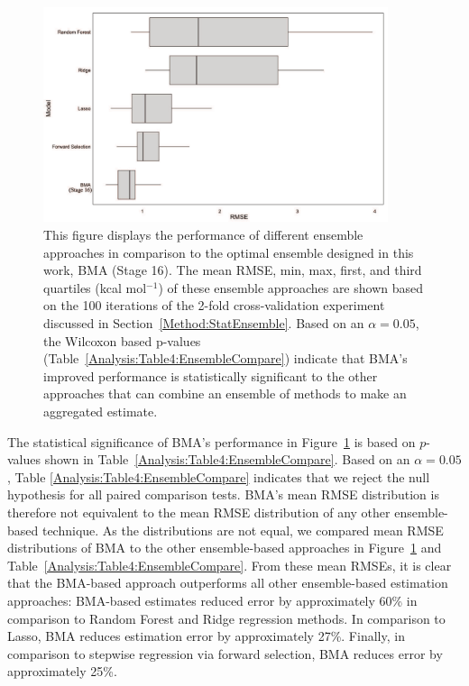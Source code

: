 \documentclass[journal=jpcbfk, manuscript=article]{achemso}
\newcommand{\+}[1]{\ensuremath{\mathbf{#1}}}
\begin{document}
\begin{figure}
	\centering
	\includegraphics[keepaspectratio,width=0.9\textwidth]{Figures/BMA_Xval_baselineModels_RMSE}
	\caption{This figure displays the performance of different ensemble approaches in comparison to the optimal ensemble designed in this work, BMA (Stage 16).
	The mean RMSE, min, max, first, and third quartiles (kcal mol$^{-1}$) of these ensemble approaches are shown based on the 100 iterations of the 2-fold cross-validation experiment discussed in Section~\ref{Method:StatEnsemble}.
	Based on an $\alpha = 0.05$, the Wilcoxon based p-values (Table~\ref{Analysis:Table4:EnsembleCompare}) indicate that BMA's improved performance is statistically significant to the other approaches that can combine an ensemble of methods to make an aggregated estimate.}
	\label{Analysis:Figure6:Models}
\end{figure}
The statistical significance of BMA's performance in Figure~\ref{Analysis:Figure6:Models} is based on $p$-values shown in Table~\ref{Analysis:Table4:EnsembleCompare}. Based on an $\alpha = 0.05$, Table \ref{Analysis:Table4:EnsembleCompare} indicates that we reject the null hypothesis for all paired comparison tests.
BMA's mean RMSE distribution is therefore not equivalent to the mean RMSE distribution of any other ensemble-based technique. 
As the distributions are not equal, we compared mean RMSE distributions of BMA to the other ensemble-based approaches in Figure~\ref{Analysis:Figure6:Models} and Table~\ref{Analysis:Table4:EnsembleCompare}.
From these mean RMSEs, it is clear that the BMA-based approach outperforms all other ensemble-based estimation approaches: BMA-based estimates reduced error by approximately 60\% in comparison to Random Forest and Ridge regression methods. In comparison to Lasso, BMA reduces estimation error by approximately 27\%.
Finally, in comparison to stepwise regression via forward selection, BMA reduces error by approximately 25\%.
\end{document}
